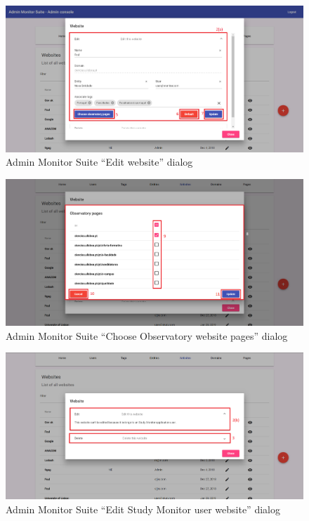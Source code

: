 \clearpage

\begin{figure}[H]
    \centering
    \includegraphics[width=\linewidth]{lib/images/admin/admin_edit_website_dialog.png}
    \caption{Admin Monitor Suite ``Edit website'' dialog}
    \label{fig:admin_edit_website_dialog}
\end{figure}

\begin{figure}[H]
    \centering
    \includegraphics[width=\linewidth]{lib/images/admin/admin_edit_website_obs_pages_dialog.png}
    \caption{Admin Monitor Suite ``Choose Observatory website pages'' dialog}
    \label{fig:admin_edit_website_obs_pages_dialog}
\end{figure}

\begin{figure}[H]
    \centering
    \includegraphics[width=\linewidth]{lib/images/admin/admin_edit_sm_website_dialog.png}
    \caption{Admin Monitor Suite ``Edit Study Monitor user website'' dialog}
    \label{fig:admin_edit_sm_website_dialog}
\end{figure}

